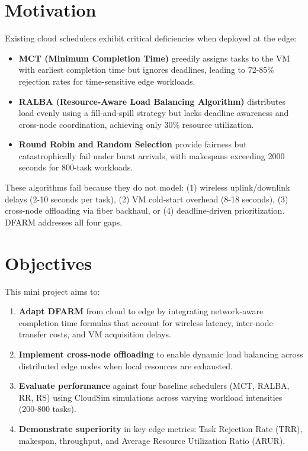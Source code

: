 \documentclass[12pt]{report}
\begin{document}
\section{Motivation}

Existing cloud schedulers exhibit critical deficiencies when deployed at the edge:

\begin{itemize}
    \item \textbf{MCT (Minimum Completion Time)} greedily assigns tasks to the VM with earliest completion time but ignores deadlines, leading to 72-85\% rejection rates for time-sensitive edge workloads.
    
    \item \textbf{RALBA (Resource-Aware Load Balancing Algorithm)} distributes load evenly using a fill-and-spill strategy but lacks deadline awareness and cross-node coordination, achieving only 30\% resource utilization.
    
    \item \textbf{Round Robin and Random Selection} provide fairness but catastrophically fail under burst arrivals, with makespans exceeding 2000 seconds for 800-task workloads.
\end{itemize}

These algorithms fail because they do not model: (1) wireless uplink/downlink delays (2-10 seconds per task), (2) VM cold-start overhead (8-18 seconds), (3) cross-node offloading via fiber backhaul, or (4) deadline-driven prioritization. DFARM addresses all four gaps.

\section{Objectives}

This mini project aims to:

\begin{enumerate}
    \item \textbf{Adapt DFARM} from cloud to edge by integrating network-aware completion time formulas that account for wireless latency, inter-node transfer costs, and VM acquisition delays.
    
    \item \textbf{Implement cross-node offloading} to enable dynamic load balancing across distributed edge nodes when local resources are exhausted.
    
    \item \textbf{Evaluate performance} against four baseline schedulers (MCT, RALBA, RR, RS) using CloudSim simulations across varying workload intensities (200-800 tasks).
    
    \item \textbf{Demonstrate superiority} in key edge metrics: Task Rejection Rate (TRR), makespan, throughput, and Average Resource Utilization Ratio (ARUR).
\end{enumerate}
\end{document}
